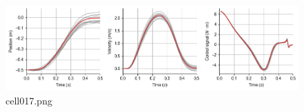 \begin{figure}[ht]
	\centering
	\includegraphics[scale=0.8, max width=\linewidth]{./fig/motor-learning/biological-ofc/cell017.png}
	\caption{cell017.png}
	\label{cell017.png}
\end{figure}